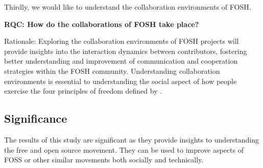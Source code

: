 \documentclass[final-report.tex]{subfiles}
\begin{document}
    \label{RQB}

Thirdly, we would like to understand the collaboration environments of FOSH.

    \textbf{RQC: How do the collaborations of FOSH take place?}
    
Rationale: Exploring the collaboration environments of FOSH projects will provide insights into the interaction dynamics between contributors, fostering better understanding and improvement of communication and cooperation strategies within the FOSH community.
Understanding collaboration environments is essential to understanding the social aspect of how people exercise the four principles of freedom defined by \cite{b0_stallman}.

    \label{RQC}
\subsection{Significance}
The results of this study are significant as they provide insights to understanding the free and open source movement. 
They can be used to improve aspects of FOSS or other similar movements both socially and technically. 


\end{document}
